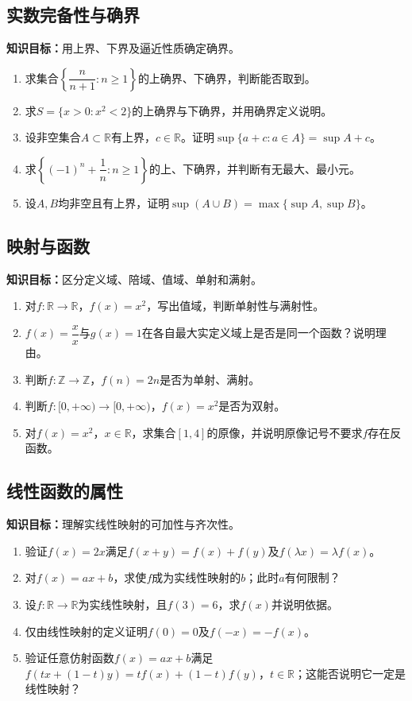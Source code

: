 \documentclass[11pt,a4paper,fontset=fandol]{ctexrep}
\newcommand{\goal}[1]{\textbf{知识目标：}#1\par}
\begin{document}
\subsection{实数完备性与确界}
\goal{用上界、下界及逼近性质确定确界。}
\begin{enumerate}
\item 求集合$\left\{\dfrac{n}{n+1}:n\ge1\right\}$的上确界、下确界，判断能否取到。
\item 求$S=\{x>0:x^2<2\}$的上确界与下确界，并用确界定义说明。
\item 设非空集合$A\subset\mathbb R$有上界，$c\in\mathbb R$。证明$\sup\{a+c:a\in A\}=\sup A+c$。
\item 求$\left\{(-1)^n+\dfrac{1}{n}:n\ge1\right\}$的上、下确界，并判断有无最大、最小元。
\item 设$A,B$均非空且有上界，证明$\sup(A\cup B)=\max\{\sup A,\sup B\}$。
\end{enumerate}
\subsection{映射与函数}
\goal{区分定义域、陪域、值域、单射和满射。}
\begin{enumerate}
\item 对$f:\mathbb R\to\mathbb R$，$f(x)=x^2$，写出值域，判断单射性与满射性。
\item $f(x)=\dfrac{x}{x}$与$g(x)=1$在各自最大实定义域上是否是同一个函数？说明理由。
\item 判断$f:\mathbb Z\to\mathbb Z$，$f(n)=2n$是否为单射、满射。
\item 判断$f:[0,+\infty)\to[0,+\infty)$，$f(x)=x^2$是否为双射。
\item 对$f(x)=x^2$，$x\in\mathbb R$，求集合$[1,4]$的原像，并说明原像记号不要求$f$存在反函数。
\end{enumerate}
\subsection{线性函数的属性}
\goal{理解实线性映射的可加性与齐次性。}
\begin{enumerate}
\item 验证$f(x)=2x$满足$f(x+y)=f(x)+f(y)$及$f(\lambda x)=\lambda f(x)$。
\item 对$f(x)=ax+b$，求使$f$成为实线性映射的$b$；此时$a$有何限制？
\item 设$f:\mathbb R\to\mathbb R$为实线性映射，且$f(3)=6$，求$f(x)$并说明依据。
\item 仅由线性映射的定义证明$f(0)=0$及$f(-x)=-f(x)$。
\item 验证任意仿射函数$f(x)=ax+b$满足$f(tx+(1-t)y)=tf(x)+(1-t)f(y)$，$t\in\mathbb R$；这能否说明它一定是线性映射？
\end{enumerate}
\end{document}
